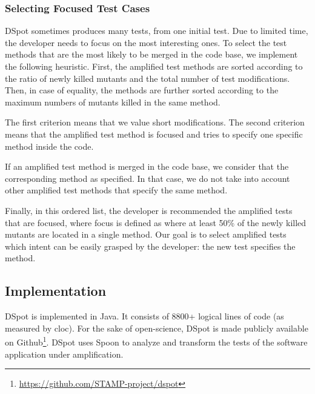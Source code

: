 \documentclass[table,xcdraw,smallextended]{svjour3}
\newcommand{\dspot}{DSpot\xspace}
\begin{document}

\subsubsection{Selecting Focused Test Cases}
\label{subsubsec:test:cases:selection:for:pr}

DSpot  sometimes produces many tests, from one initial test.
Due to limited time, the developer needs to focus on the most interesting ones.
To select the test methods that are the most likely to be merged in the code base, we implement the following  heuristic.
First, the amplified test methods are sorted according to the ratio of newly killed mutants and the total number of test modifications.
Then, in case of equality, the methods are further sorted according to the maximum numbers of mutants killed in the same method.

The first criterion means that we value short modifications.
The second criterion means that the amplified test method is focused and tries to specify one specific method inside the code.

If an amplified test method is merged in the code base, we consider that the corresponding method as specified. In that case, we do not take into account other amplified test methods that specify the same method.

Finally, in this ordered list, the developer is recommended the amplified tests that are focused, where focus is defined as where at least 50\% of the newly killed mutants are located in a single method. Our goal is to select amplified tests which intent can be easily grasped by the developer: the new test specifies the method.

\subsection{Implementation}

\dspot is implemented in Java.
It consists of 8800+ logical lines of code (as measured by cloc).
For the sake of open-science, \dspot is made publicly available on Github\footnote{\url{https://github.com/STAMP-project/dspot}}.
\dspot uses Spoon\cite{pawlak:hal-01169705} to analyze and transform the tests of the software application under amplification.
\end{document}
